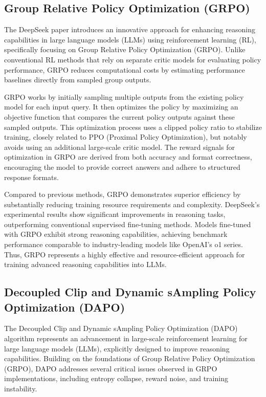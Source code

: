 \documentclass[11pt, oneside]{article}   	%
\begin{document}
\subsection*{Group Relative Policy Optimization (GRPO) \cite{deepseekai2025deepseekr1incentivizingreasoningcapability}}

The DeepSeek paper introduces an innovative approach for enhancing reasoning capabilities in large language models (LLMs) using reinforcement learning (RL), specifically focusing on Group Relative Policy Optimization (GRPO). Unlike conventional RL methods that rely on separate critic models for evaluating policy performance, GRPO reduces computational costs by estimating performance baselines directly from sampled group outputs.

GRPO works by initially sampling multiple outputs from the existing policy model for each input query. It then optimizes the policy by maximizing an objective function that compares the current policy outputs against these sampled outputs. This optimization process uses a clipped policy ratio to stabilize training, closely related to PPO (Proximal Policy Optimization), but notably avoids using an additional large-scale critic model. The reward signals for optimization in GRPO are derived from both accuracy and format correctness, encouraging the model to provide correct answers and adhere to structured response formats.

Compared to previous methods, GRPO demonstrates superior efficiency by substantially reducing training resource requirements and complexity. DeepSeek’s experimental results show significant improvements in reasoning tasks, outperforming conventional supervised fine-tuning methods. Models fine-tuned with GRPO exhibit strong reasoning capabilities, achieving benchmark performance comparable to industry-leading models like OpenAI's o1 series. Thus, GRPO represents a highly effective and resource-efficient approach for training advanced reasoning capabilities into LLMs.

\subsection*{Decoupled Clip and Dynamic sAmpling Policy Optimization (DAPO) \cite{yu2025dapoopensourcellmreinforcement}}

The Decoupled Clip and Dynamic sAmpling Policy Optimization (DAPO) algorithm represents an advancement in large-scale reinforcement learning for large language models (LLMs), explicitly designed to improve reasoning capabilities. Building on the foundations of Group Relative Policy Optimization (GRPO), DAPO addresses several critical issues observed in GRPO implementations, including entropy collapse, reward noise, and training instability.
\end{document}
